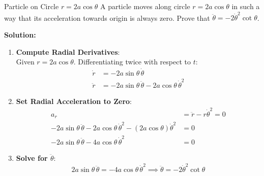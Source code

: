 \begin{examplebox}{Particle on Circle $r = 2a \cos\theta$}
A particle moves along circle $r = 2a \cos\theta$ in such a way that its acceleration towards origin is always zero. Prove that $\ddot{\theta} = -2 \dot{\theta}^2 \cot\theta$.

\tcblower
\textbf{Solution:}

\begin{enumerate}[leftmargin=1.5em]
    \item \textbf{Compute Radial Derivatives}:\\
    Given $r = 2a \cos\theta$. Differentiating twice with respect to $t$:
    \begin{align*}
        \dot{r} &= -2a \sin\theta \, \dot{\theta} \\
        \ddot{r} &= -2a \sin\theta \, \ddot{\theta} - 2a \cos\theta \, \dot{\theta}^2
    \end{align*}

    \item \textbf{Set Radial Acceleration to Zero}:\\
    \begin{align*}
        a_r &= \ddot{r} - r \dot{\theta}^2 = 0 \\
        -2a \sin\theta \, \ddot{\theta} - 2a \cos\theta \, \dot{\theta}^2 - (2a \cos\theta) \dot{\theta}^2 &= 0 \\
        -2a \sin\theta \, \ddot{\theta} - 4a \cos\theta \, \dot{\theta}^2 &= 0
    \end{align*}

    \item \textbf{Solve for $\ddot{\theta}$}:\\
    \begin{equation*}
        2a \sin\theta \, \ddot{\theta} = -4a \cos\theta \, \dot{\theta}^2 \implies \ddot{\theta} = -2 \dot{\theta}^2 \cot\theta
    \end{equation*}
\end{enumerate}
\end{examplebox}

